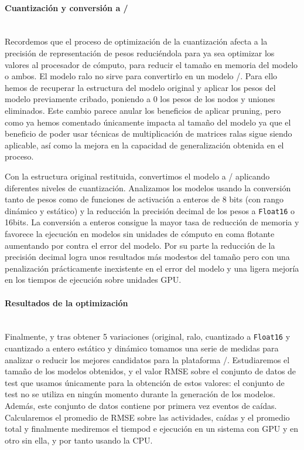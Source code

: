 \paragraph{Cuantización y conversión a \tflite/}\\

Recordemos que el proceso de optimización de la cuantización afecta a la precisión de representación de pesos reduciéndola para ya sea optimizar los valores al procesador de cómputo, para reducir el tamaño en memoria del modelo o ambos. El modelo ralo no sirve para convertirlo en un modelo \tflite/. Para ello hemos de recuperar la estructura del modelo original y aplicar los pesos del modelo previamente cribado, poniendo a 0 los pesos de los nodos y uniones eliminados. Este cambio parece anular los beneficios de aplicar pruning, pero como ya hemos comentado únicamente impacta al tamaño del modelo ya que el beneficio de poder usar técnicas de multiplicación de matrices ralas sigue siendo aplicable, así como la mejora en la capacidad de generalización obtenida en el proceso.

Con la estructura original restituida, convertimos el modelo a \tflite/ aplicando diferentes niveles de cuantización. Analizamos los modelos usando la conversión tanto de pesos como de funciones de activación a enteros de 8 bits (con rango dinámico y estático) y la reducción la precisión decimal de los pesos a \texttt{Float16} o 16bits. La conversión a enteros consigue la mayor tasa de reducción de memoria y favorece la ejecución en modelos sin unidades de cómputo en coma flotante aumentando por contra el error del modelo. Por su parte la reducción de la precisión decimal logra unos resultados más modestos del tamaño pero con una penalización prácticamente inexistente en el error del modelo y una ligera mejoría en los tiempos de ejecución sobre unidades GPU.


\paragraph{Resultados de la optimización}\\
Finalmente, y tras obtener 5 variaciones (original, ralo, cuantizado a \texttt{Float16} y cuantizado a entero estático y dinámico tomamos una serie de medidas para analizar o reducir los mejores candidatos para la plataforma \ifell/. Estudiaremos el tamaño de los modelos obtenidos, y el valor RMSE sobre el conjunto de datos de test que usamos únicamente para la obtención de estos valores: el conjunto de test no se utiliza en ningún momento durante la generación de los modelos. Además, este conjunto de datos contiene por primera vez eventos de caídas. Calcularemos el promedio de RMSE sobre las actividades, caídas y el promedio total y finalmente mediremos el tiempod e ejecución en un sistema con GPU y en otro sin ella, y por tanto usando la CPU.

